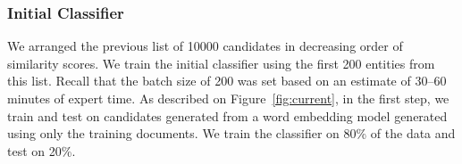 
\subsubsection{Initial Classifier}


We arranged the previous list of \num{10000} candidates in decreasing order of similarity scores.
We train the initial classifier using the first
200 entities from this list.
Recall that the batch size of 200 was set based on an estimate of 30--60 minutes of expert time.
As described on Figure~\ref{fig:current}, in the first step, we train and test on candidates generated from a word embedding model generated using only the training documents. 
We train the classifier on 80\% of the data and test on 20\%.

